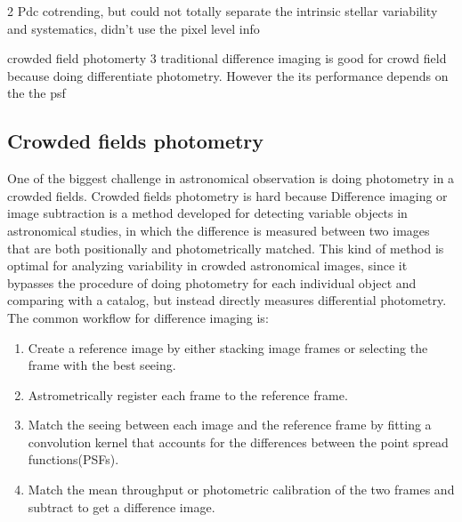 \documentclass[12pt, preprint]{aastex}
\begin{document}
2 Pdc cotrending, but could not totally separate the intrinsic stellar variability and  systematics, didn’t use the pixel level info

crowded field photomerty
3 traditional difference imaging is good for crowd field because doing differentiate photometry. However the its performance depends on the the psf

\subsection{Crowded fields photometry}
One of the biggest challenge in astronomical observation is doing photometry in a crowded fields.
Crowded fields photometry is hard because
Difference imaging or image subtraction is a method developed for detecting variable objects in astronomical studies, in which the difference is measured between two images that are both positionally and photometrically matched. This kind of method is optimal for analyzing variability in crowded astronomical images, since it bypasses the procedure of doing photometry for each individual object and comparing with a catalog, but instead directly measures differential photometry.
The common workflow for difference imaging is:
\begin{enumerate}
\item
Create a reference image by either stacking image frames or selecting the frame with the best seeing.
\item
Astrometrically register each frame to the reference frame.
\item
Match the seeing between each image and the reference frame by fitting a convolution kernel that accounts for the differences between the point spread functions(PSFs).
\item
Match the mean throughput or photometric calibration of the two frames and subtract to get a difference image.
\end{enumerate}
\end{document}
